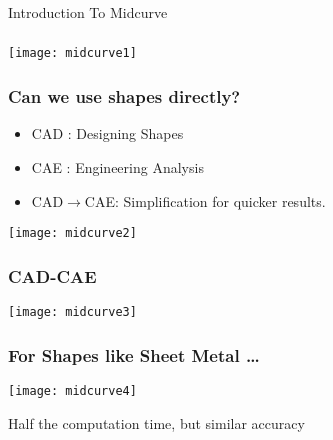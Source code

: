 
\begin{frame}[fragile]\frametitle{}
\begin{center}
{\Large Introduction To Midcurve}
\end{center}
\end{frame}

\begin{frame}[fragile]\frametitle{}
\begin{center}
\texttt{[image: midcurve1]}
\end{center}
\end{frame}


\begin{frame}[fragile]\frametitle{Can we use shapes directly?}
	\begin{itemize}
	\item CAD : Designing Shapes
	\item CAE : Engineering Analysis
	\item CAD$\rightarrow$CAE: Simplification for quicker results.
	\end{itemize}

\begin{center}
\texttt{[image: midcurve2]}
\end{center}

\end{frame}

\begin{frame}[fragile]\frametitle{CAD-CAE}
\begin{center}
\texttt{[image: midcurve3]}
\end{center}
\end{frame}

\begin{frame}[fragile]\frametitle{For Shapes like Sheet Metal \ldots}
\begin{center}
\texttt{[image: midcurve4]}
\end{center}
Half the computation time, but similar accuracy
\end{frame}

